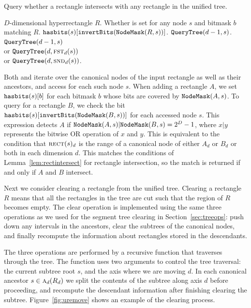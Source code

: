 \documentclass[english,gradu]{tktltiki2018}
\begin{document}
\begin{algorithm}
\caption{Query whether a rectangle intersects with any rectangle in the unified tree.}\label{alg:ucheck}
\begin{algorithmic}
\Require $D$-dimensional hyperrectangle $R$.
\Output Whether  is set for any node $s$ and bitmask $b$ matching $R$.
		\State \Return $\hasbits{s}{\texttt{invertBits}(\maskof{R,s})}$.
		\State \Return $\checkdt(d-1,s)$.
		\State \Return $\checkdt(d-1,s)$ \\
		\hspace{20mm} or $\checkdt(d,\leftu{s}{d})$ \\
		\hspace{20mm} or $\checkdt(d,\rightu{s}{d})$.
	\EndIf
\EndProcedure
\end{algorithmic}
\end{algorithm}

Both \adddt and \checkdt iterate over the canonical nodes of the input rectangle as well as their ancestors, and access  for each such node $s$.
When adding a rectangle $A$, we set $\hasbits{s}{b}$ for each bitmask $b$ whose bits are covered by $\maskof{A,s}$.
To query for a rectangle $B$, we check the bit $\hasbits{s}{\texttt{invertBits}(\maskof{B,s})}$ for each accessed node $s$.
This expression detects $A$ if $\maskof{A,s}|\maskof{B,s}=2^D-1$, where $x|y$ represents the bitwise OR operation of $x$ and $y$.
This is equivalent to the condition that $\rect{s}_d$ is the range of a canonical node of either $A_d$ or $B_d$ or both in each dimension $d$.
This matches the conditions of Lemma~\ref{lem:rectintersect} for rectangle intersection, so the match is returned if and only if $A$ and $B$ intersect.

Next we consider clearing a rectangle from the unified tree.
Clearing a rectangle $R$ means that all the rectangles in the tree are cut such that the region of $R$ becomes empty.
The clear operation is implemented using the same three operations as we used for the segment tree clearing in Section~\ref{sec:treeops}:
push down any intervals in the ancestors, clear the subtrees of the canonical nodes, and finally recompute the information about rectangles stored in the descendants.

The three operations are performed by a recursive function \cleardt that traverses through the tree.
The function uses two arguments to control the tree traversal: the current subtree root $s$, and the axis where we are moving $d$.
In each canonical ancestor $s\in\canonpari{R_d}{d}$ we split the contents of the subtree along axis $d$ before proceeding, and recompute the descendant information after finishing clearing the subtree.
Figure~\ref{fig:uremove} shows an example of the clearing process.
\end{document}
